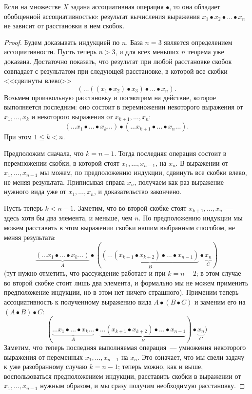 \begin{theorem}
Если на множестве $X$ задана ассоциативная операция $\bullet$, то она
обладает обобщенной ассоциативностью: результат вычисления выражения
$x_1\bullet x_2\bullet\dots\bullet x_n$ не зависит от расстановки в
нем скобок.
\end{theorem}
\begin{proof}
Будем доказывать индукцией по $n$. База $n=3$ является определением
ассоциативности. Пусть теперь $n>3$, и для всех меньших $n$ теорема
уже доказана.
Достаточно показать, что результат при любой расстановке скобок
совпадает с результатом при следующей расстановке, в которой все скобки
<<сдвинуты влево>>
$$
(\dots ((x_1\bullet x_2)\bullet x_3)\bullet\dots\bullet x_n).
$$
Возьмем произвольную расстановку и посмотрим на действие, которое
выполняется последним: оно состоит в перемножении некоторого выражения
от $x_1,\dots,x_k$ и некоторого выражения от $x_{k+1},\dots,x_n$:
$$
(\dots x_1\bullet\dots\bullet x_k\dots) \bullet
(\dots x_{k+1}\bullet\dots\bullet x_n\dots).
$$
При этом $1 \leq k < n$.

Предположим сначала, что $k = n-1$. Тогда последняя операция состоит в
перемножении скобки, в которой стоят $x_1,\dots,x_{n-1}$, на $x_n$. В
выражении от $x_1,\dots,x_{n-1}$ мы можем, по предположению индукции,
сдвинуть все скобки влево, не меняя результата. Приписывая справа
$x_n$, получаем как раз выражение нужного вида уже от
$x_1,\dots,x_n$, и доказательство закончено.

Пусть теперь $k<n-1$. Заметим, что во второй скобке стоят
$x_{k+1},\dots,x_n$~--- здесь хотя бы два элемента, и меньше, чем
$n$. По предположению индукции мы можем расставить в этом выражении
скобки нашим выбранным способом, не меняя результата:
$$
\underbrace{\left(\dots x_1\bullet\dots\bullet x_k\dots\right)}_{A} \bullet
(\underbrace{(\dots (x_{k+1}\bullet x_{k+2})\bullet\dots\bullet x_{n-1})}_B\bullet\underbrace{x_n}_C)
$$
(тут нужно отметить, что рассуждение работает и при $k=n-2$; в этом
случае во второй скобке стоит лишь два элемента, и формально мы не
можем применить предположение индукции, но в этом нет ничего страшного).
Применим теперь ассоциативность к полученному выражению вида
$A\bullet (B\bullet C)$ и заменим его на $(A\bullet B)\bullet C$:
$$
(\underbrace{\dots x_1\bullet\dots\bullet x_k\dots}_{A} \bullet
\underbrace{\dots (x_{k+1}\bullet x_{k+2})\bullet\dots\bullet x_{n-1}}_B)\bullet\underbrace{x_n}_C)
$$
Заметим, что теперь последняя выполняемая операция~--- умножения
некоторого выражения от переменных $x_1,\dots,x_{n-1}$ на $x_n$. Это
означает,
что мы свели задачу к уже разобранному случаю $k=n-1$; теперь можно,
как и выше, воспользоваться предположением индукции, расставить скобки
в выражении от $x_1,\dots,x_{n-1}$ нужным образом, и мы сразу получим
необходимую расстановку.
\end{proof}

